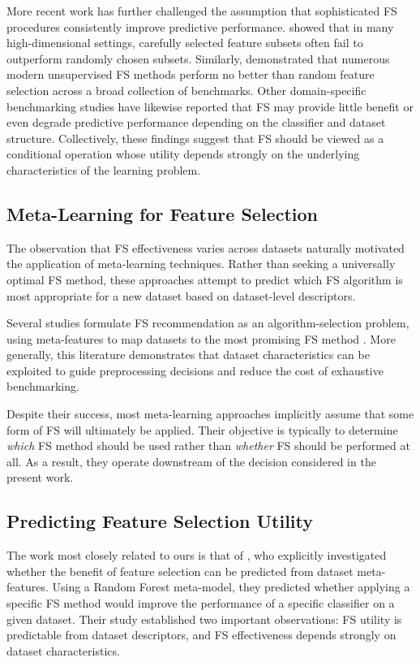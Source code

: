 \documentclass[preprint,12pt,authoryear]{elsarticle}
\begin{document}
More recent work has further challenged the assumption that sophisticated FS procedures consistently improve predictive performance. \citet{chen2025insignificance} showed that in many high-dimensional settings, carefully selected feature subsets often fail to outperform randomly chosen subsets. Similarly, \citet{rajabinasab2026worse} demonstrated that numerous modern unsupervised FS methods perform no better than random feature selection across a broad collection of benchmarks. Other domain-specific benchmarking studies have likewise reported that FS may provide little benefit or even degrade predictive performance depending on the classifier and dataset structure. Collectively, these findings suggest that FS should be viewed as a conditional operation whose utility depends strongly on the underlying characteristics of the learning problem.

\subsection{Meta-Learning for Feature Selection}

The observation that FS effectiveness varies across datasets naturally motivated the application of meta-learning techniques. Rather than seeking a universally optimal FS method, these approaches attempt to predict which FS algorithm is most appropriate for a new dataset based on dataset-level descriptors.

Several studies formulate FS recommendation as an algorithm-selection problem, using meta-features to map datasets to the most promising FS method \citep{parmezan2017metalearning,filchenkov2015datasets,shen2020metalearning}. More generally, this literature demonstrates that dataset characteristics can be exploited to guide preprocessing decisions and reduce the cost of exhaustive benchmarking.

Despite their success, most meta-learning approaches implicitly assume that some form of FS will ultimately be applied. Their objective is typically to determine \emph{which} FS method should be used rather than \emph{whether} FS should be performed at all. As a result, they operate downstream of the decision considered in the present work.

\subsection{Predicting Feature Selection Utility}

The work most closely related to ours is that of \citet{post2016does}, who explicitly investigated whether the benefit of feature selection can be predicted from dataset meta-features. Using a Random Forest meta-model, they predicted whether applying a specific FS method would improve the performance of a specific classifier on a given dataset. Their study established two important observations: FS utility is predictable from dataset descriptors, and FS effectiveness depends strongly on dataset characteristics.
\end{document}
